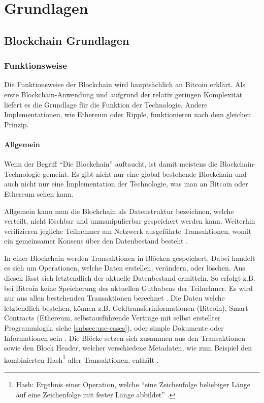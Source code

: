 \chapter{Grundlagen}
\label{cha:grundlagen}

\section{Blockchain Grundlagen}

\subsection{Funktionsweise}
Die Funktionsweise der Blockchain wird hauptsächlich an Bitcoin erklärt. Als erste Blockchain-Anwendung \cite{ZhengBlockchainChallengesOpportunities2017} und aufgrund der relativ geringen Komplexität liefert es die Grundlage für die Funktion der Technologie. Andere Implementationen, wie Ethereum oder Ripple, funktionieren nach dem gleichen Prinzip.

\subsubsection{Allgemein}
Wenn der Begriff ``Die Blockchain'' auftaucht, ist damit meistens die Blockchain-Technologie gemeint. Es gibt nicht nur eine global bestehende Blockchain und auch nicht nur eine Implementation der Technologie, was man an Bitcoin oder Ethereum sehen kann.

Allgemein kann man die Blockchain als Datenstruktur bezeichnen, welche verteilt, nicht löschbar und unmanipulierbar gespeichert werden kann. Weiterhin verifizieren jegliche Teilnehmer am Netzwerk ausgeführte Transaktionen, womit ein gemeinsamer Konsens über den Datenbestand besteht \cite{CrosbyBlockChainTechnologyBitcoin2016}.

In einer Blockchain werden Transaktionen in Blöcken gespeichert. Dabei handelt es sich um Operationen, welche Daten erstellen, verändern, oder löschen. Aus diesen lässt sich letztendlich der aktuelle Datenbestand ermitteln. So erfolgt z.B. bei Bitcoin keine Speicherung des aktuellen Guthabens der Teilnehmer. Es wird nur aus allen bestehenden Transaktionen berechnet \cite{AntonopoulosMasteringbitcoin2015}. Die Daten welche letztendlich bestehen, können z.B. Geldtransferinformationen (Bitcoin), Smart Contracts (Ethereum, selbstausführende Verträge mit selbst erstellter Programmlogik, siehe \ref{subsec:use-cases}), oder simple Dokumente oder Informationen sein \cite{EthereumTeamEthereumWhitePaper2017}\cite{NakamotoBitcoinPeertoPeerElectronic2008}\cite{HyperledgerFabricTeamHyperledgerWhitepaper2016}. Die Blöcke setzen sich zusammen aus den Transaktionen sowie den Block Header, welcher verschiedene Metadaten, wie zum Beispiel den kombinierten Hash\footnote{Hash: Ergebnis einer Operation, welche ``eine Zeichenfolge beliebiger Länge auf eine Zeichenfolge mit fester Länge abbildet'' \cite{AntonopoulosMasteringbitcoin2015}.} aller Transaktionen, enthält \cite{AntonopoulosMasteringbitcoin2015}.

